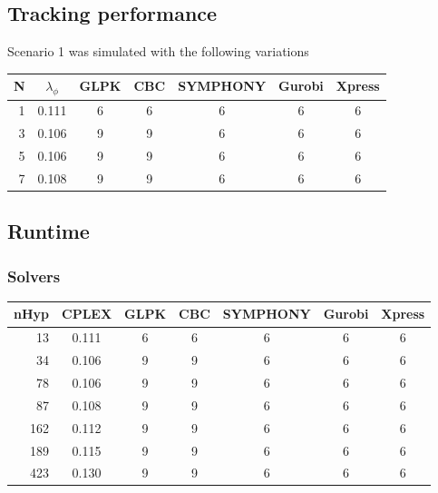 \subsection{Tracking performance}
Scenario 1 was simulated with the following variations

\begin{tabular}{ r c c c c c c}
N 	& $\lambda_\phi$ & GLPK 	& CBC	& SYMPHONY	& Gurobi	& Xpress	\\ \hline
1 	& 0.111	& 6 	& 6		& 6			& 6			& 6			\\
3 	& 0.106	& 9		& 9		& 6			& 6			& 6			\\
5 	& 0.106	& 9		& 9		& 6			& 6			& 6			\\
7 	& 0.108	& 9		& 9		& 6			& 6			& 6			\\
\end{tabular}

\subsection{Runtime}
\subsubsection{Solvers}

\begin{tabular}{ r c c c c c c}
nHyp 	& CPLEX & GLPK 	& CBC	& SYMPHONY	& Gurobi	& Xpress	\\ \hline
13 		& 0.111	& 6 	& 6		& 6			& 6			& 6			\\
34 		& 0.106	& 9		& 9		& 6			& 6			& 6			\\
78 		& 0.106	& 9		& 9		& 6			& 6			& 6			\\
87 		& 0.108	& 9		& 9		& 6			& 6			& 6			\\
162 	& 0.112	& 9		& 9		& 6			& 6			& 6			\\
189 	& 0.115	& 9		& 9		& 6			& 6			& 6			\\
423 	& 0.130	& 9		& 9		& 6			& 6			& 6			\\
\end{tabular}